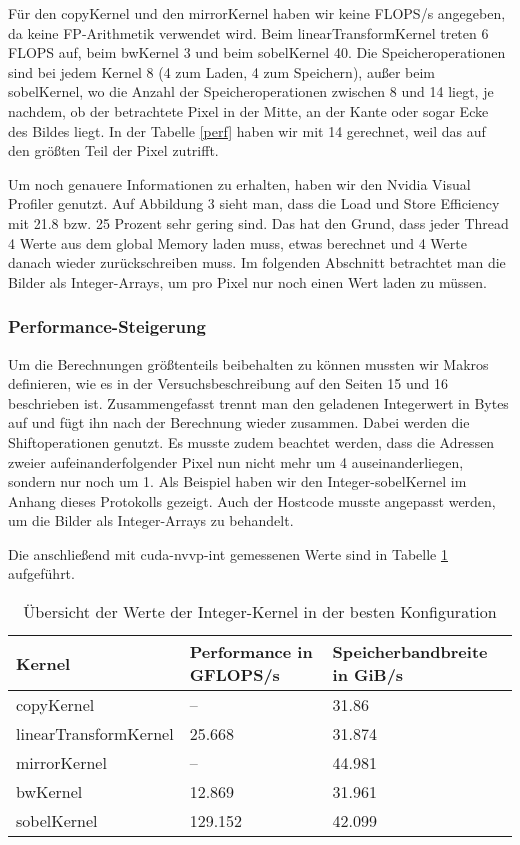 \documentclass[12pt,a4paper]{scrartcl}
\begin{document}
F\"ur den copyKernel und den mirrorKernel haben wir keine FLOPS/s angegeben, da keine FP-Arithmetik verwendet wird.
Beim linearTransformKernel treten 6 FLOPS auf, beim bwKernel 3 und beim sobelKernel 40.
Die Speicheroperationen sind bei jedem Kernel 8 (4 zum Laden, 4 zum Speichern), au\ss er beim sobelKernel, wo die Anzahl der Speicheroperationen zwischen 8 und 14 liegt, je nachdem, ob der betrachtete Pixel in der Mitte, an der Kante oder sogar Ecke des Bildes liegt.
In der Tabelle \ref{perf} haben wir mit 14 gerechnet, weil das auf den gr\"o\ss ten Teil der Pixel zutrifft.

Um noch genauere Informationen zu erhalten, haben wir den Nvidia Visual Profiler genutzt.
Auf Abbildung 3 sieht man, dass die Load und Store Efficiency mit 21.8 bzw. 25 Prozent sehr gering sind.
Das hat den Grund, dass jeder Thread 4 Werte aus dem global Memory laden muss, etwas berechnet und 4 Werte danach wieder zur\"uckschreiben muss.
Im folgenden Abschnitt betrachtet man die Bilder als Integer-Arrays, um pro Pixel nur noch einen Wert laden zu m\"ussen.

\subsubsection{Performance-Steigerung}
Um die Berechnungen gr\"o\ss tenteils beibehalten zu k\"onnen mussten wir Makros definieren, wie es in der Versuchsbeschreibung auf den Seiten 15 und 16 beschrieben ist.
Zusammengefasst trennt man den geladenen Integerwert in Bytes auf und f\"ugt ihn nach der Berechnung wieder zusammen.
Dabei werden die Shiftoperationen genutzt.
Es musste zudem beachtet werden, dass die Adressen zweier aufeinanderfolgender Pixel nun nicht mehr um 4 auseinanderliegen, sondern nur noch um 1.
Als Beispiel haben wir den Integer-sobelKernel im Anhang dieses Protokolls gezeigt.
Auch der Hostcode musste angepasst werden, um die Bilder als Integer-Arrays zu behandelt.

Die anschlie\ss end mit cuda-nvvp-int gemessenen Werte sind in Tabelle \ref{perf-int} aufgef\"uhrt.

\begin{table}[h]
    \centering
    \begin{tabular}{l|l|l}
    \hline
    Kernel & Performance in GFLOPS/s & Speicherbandbreite in GiB/s \\
    \hline
    copyKernel & --                  & 31.86  \\
    linearTransformKernel & 25.668   & 31.874 \\
    mirrorKernel & --                & 44.981 \\
    bwKernel & 12.869                & 31.961 \\
    sobelKernel & 129.152            & 42.099 \\
    \hline
    \end{tabular}
    \caption{\"Ubersicht der Werte der Integer-Kernel in der besten Konfiguration}
    \label{perf-int}
\end{table}
\end{document}

